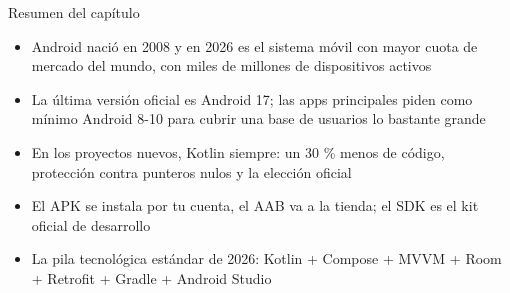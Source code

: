 \begin{tcbsummary}{Resumen del capítulo}
\begin{itemize}
  \item Android nació en 2008 y en 2026 es el sistema móvil con mayor cuota de mercado del mundo, con miles de millones de dispositivos activos
  \item La última versión oficial es Android 17; las apps principales piden como mínimo Android 8-10 para cubrir una base de usuarios lo bastante grande
  \item En los proyectos nuevos, Kotlin siempre: un 30 \% menos de código, protección contra punteros nulos y la elección oficial
  \item El APK se instala por tu cuenta, el AAB va a la tienda; el SDK es el kit oficial de desarrollo
  \item La pila tecnológica estándar de 2026: Kotlin + Compose + MVVM + Room + Retrofit + Gradle + Android Studio
\end{itemize}

\end{tcbsummary}
